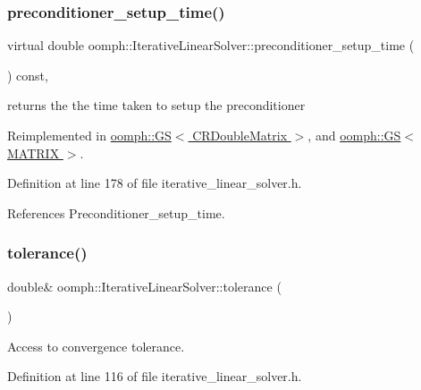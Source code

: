 \subsubsection{\texorpdfstring{preconditioner\+\_\+setup\+\_\+time()}{preconditioner\_setup\_time()}}
{\footnotesize\ttfamily virtual double oomph\+::\+Iterative\+Linear\+Solver\+::preconditioner\+\_\+setup\+\_\+time (\begin{DoxyParamCaption}{ }\end{DoxyParamCaption}) const\hspace{0.3cm}{\ttfamily [inline]}, {\ttfamily [virtual]}}



returns the the time taken to setup the preconditioner 



Reimplemented in \hyperlink{classoomph_1_1GS_3_01CRDoubleMatrix_01_4_af3ddbbec56c0ecc849b07bcec0c19bf4}{oomph\+::\+G\+S$<$ C\+R\+Double\+Matrix $>$}, and \hyperlink{classoomph_1_1GS_a5ee0e379319f6919f7ac00a715be72fb}{oomph\+::\+G\+S$<$ M\+A\+T\+R\+I\+X $>$}.



Definition at line 178 of file iterative\+\_\+linear\+\_\+solver.\+h.



References Preconditioner\+\_\+setup\+\_\+time.

\mbox{\label{classoomph_1_1IterativeLinearSolver_aa76d0f94116e2bfa615652b9de9b1af7}} 
\subsubsection{\texorpdfstring{tolerance()}{tolerance()}}
{\footnotesize\ttfamily double\& oomph\+::\+Iterative\+Linear\+Solver\+::tolerance (\begin{DoxyParamCaption}{ }\end{DoxyParamCaption})\hspace{0.3cm}{\ttfamily [inline]}}



Access to convergence tolerance. 



Definition at line 116 of file iterative\+\_\+linear\+\_\+solver.\+h.



